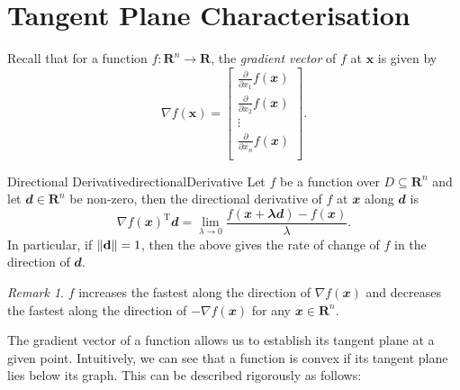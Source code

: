 \documentclass[math]{amznotes}
\theoremstyle{remark}
\newtheorem*{remark}{Remark}
\begin{document}
\section{Tangent Plane Characterisation}
Recall that for a function $f \colon \mathbf{R}^n \to \mathbf{R}$, the \textit{gradient vector} of $f$ at $\mathbf{x}$ is given by
\begin{equation*}
    \nabla f(\mathbf{x}) = \begin{bmatrix}
        \frac{\partial}{\partial x_1}f(\mathbfit{x}) \\
        \frac{\partial}{\partial x_2}f(\mathbfit{x}) \\
        \vdots \\
        \frac{\partial}{\partial x_n}f(\mathbfit{x}) \\
    \end{bmatrix}.
\end{equation*}
\begin{probox}{Directional Derivative}{directionalDerivative}
    Let $f$ be a function over $D \subseteq \mathbf{R}^n$ and let $\mathbfit{d} \in \mathbf{R}^n$ be non-zero, then the directional derivative of $f$ at $\mathbfit{x}$ along $\mathbfit{d}$ is
    \begin{equation*}
        \nabla f(\mathbfit{x})^{\mathrm{T}}\mathbfit{d} = \lim_{\lambda \to 0}\frac{f(\mathbfit{x + \lambda\mathbfit{d}}) - f(\mathbfit{x})}{\lambda}.
    \end{equation*}
    In particular, if ${\left\lVert {\mathbf{d}} \right\rVert} = 1$, then the above gives the rate of change of $f$ in the direction of $\mathbfit{d}$.
\end{probox}
\begin{notebox}
    \begin{remark}
        $f$ increases the fastest along the direction of $\nabla f(\mathbfit{x})$ and decreases the fastest along the direction of $-\nabla f(\mathbfit{x})$ for any $\mathbfit{x} \in \mathbf{R}^n$.
    \end{remark}
\end{notebox}
The gradient vector of a function allows us to establish its tangent plane at a given point. Intuitively, we can see that a function is convex if its tangent plane lies below its graph. This can be described rigorously as follows:
\end{document}
